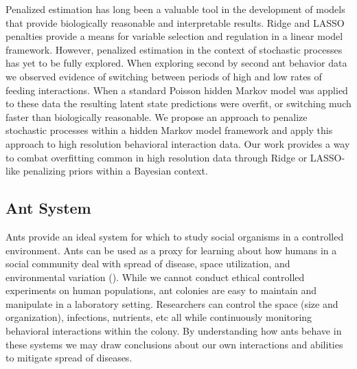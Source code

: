 \documentclass[cmbright,fleqn,referee]{envauth}
\begin{document}
Penalized estimation has long been a valuable tool in the development of models that provide biologically reasonable and interpretable results.  Ridge and LASSO penalties provide a means for variable selection and regulation in a linear model framework.  However, penalized estimation in the context of stochastic processes has yet to be fully explored. When exploring second by second ant behavior data we observed evidence of switching between periods of high and low rates of feeding interactions. When a standard Poisson hidden Markov model was applied to these data the resulting latent state predictions were overfit, or switching much faster than biologically reasonable.  We propose an approach to penalize stochastic processes within a hidden Markov model framework and apply this approach to high resolution behavioral interaction data. Our work provides a way to combat overfitting common in high resolution data through  Ridge or LASSO-like penalizing priors within a Bayesian context.

\subsection{Ant System}
Ants provide an ideal system for which to study social organisms in a controlled environment. Ants can be used as a proxy for learning about how humans in a social community deal with spread of disease, space utilization, and environmental variation (\cite{Fewell2013}). While we cannot conduct ethical controlled experiments on human populations, ant colonies are easy to maintain and manipulate in a laboratory setting. Researchers can control the space (size and organization), infections, nutrients, etc all while continuously monitoring behavioral interactions within the colony. By understanding how ants behave in these systems we may draw conclusions about our own interactions and abilities to mitigate spread of diseases. 
\end{document}
